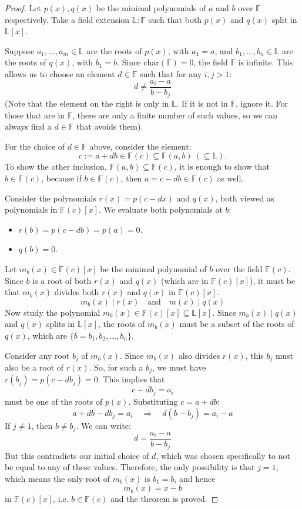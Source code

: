 \begin{proof}
Let $p(x), q(x)$ be the minimal polynomials of $a$ and $b$ over $\mathbb{F}$ respectively. Take a field extension $\mathbb{L}:\mathbb{F}$ such that both $p(x)$ and $q(x)$ split in $\mathbb{L}[x]$.

Suppose $a_1, \dots, a_m \in \mathbb{L}$ are the roots of $p(x)$, with $a_1=a$, and $b_1, \dots, b_n \in \mathbb{L}$ are the roots of $q(x)$, with $b_1=b$. Since $\text{char}(\mathbb{F})=0$, the field $\mathbb{F}$ is infinite. This allows us to choose an element $d \in \mathbb{F}$ such that
for any $i, j > 1$:
\[ d \neq \frac{a_i - a}{b - b_j} \]
(Note that the element on the right is only in $\mathbb{L}$. If it is not in $\mathbb{F}$, ignore it. For those that are in $\mathbb{F}$, there are only a finite number of such values, so we can always find a $d \in \mathbb{F}$ that avoids them).

For the choice of $d \in \mathbb{F}$ above, consider the element:
$$c := a + db \in \mathbb{F}(c) \subseteq \mathbb{F}(a,b)\ (\subseteq \mathbb{L}).$$
To show the other inclusion, $\mathbb{F}(a,b) \subseteq \mathbb{F}(c)$, it is enough to show that $b \in \mathbb{F}(c)$, because if $b \in \mathbb{F}(c)$, then $a = c - db \in \mathbb{F}(c)$ as well.

Consider the polynomials $r(x) = p(c-dx)$ and $q(x)$, both viewed as polynomials in $\mathbb{F}(c)[x]$.
We evaluate both polynomials at $b$:
\begin{itemize}
    \item $r(b) = p(c-db) = p(a) = 0$.
    \item $q(b) = 0$.
\end{itemize}
Let $m_b(x) \in \mathbb{F}(c)[x]$ be the minimal polynomial of $b$ over the field $\mathbb{F}(c)$.
Since $b$ is a root of both $r(x)$ and $q(x)$ (which are in $\mathbb{F}(c)[x]$), it must be that $m_b(x)$ divides both $r(x)$ and $q(x)$ in $\mathbb{F}(c)[x]$.
\[ m_b(x) \mid r(x) \quad \text{and} \quad m(x) \mid q(x) \]
Now study the polynomial $m_b(x) \in \mathbb{F}(c)[x] \subseteq \mathbb{L}[x]$. Since $m_b(x) \mid q(x)$ and $q(x)$ splits in $\mathbb{L}[x]$, the roots of $m_b(x)$ must be a subset of the roots of $q(x)$, which are $\{b = b_1, b_2, \dots, b_n\}$.

Consider any root $b_j$ of $m_b(x)$. Since $m_b(x)$ also divides $r(x)$, this $b_j$ must also be a root of $r(x)$.
So, for such a $b_j$, we must have $r(b_j) = p(c - db_j) = 0$.
This implies that 
\[ c - db_j = a_i \]
must be one of the roots of $p(x)$. Substituting $c=a+db$:
\[ a + db - db_j = a_i \quad \Longrightarrow \quad d(b - b_j) = a_i - a \]
If $j \neq 1$, then $b \neq b_j$. We can write:
\[ d = \frac{a_i - a}{b - b_j} \]
But this contradicts our initial choice of $d$, which was chosen specifically to not be equal to any of these values.
Therefore, the only possibility is that $j=1$, which means the only root of $m_b(x)$ is $b_1 = b$, and hence 
$$m_b(x) = x - b$$
in $\mathbb{F}(c)[x]$, i.e. $b \in \mathbb{F}(c)$ and the theorem is proved.
\end{proof}
